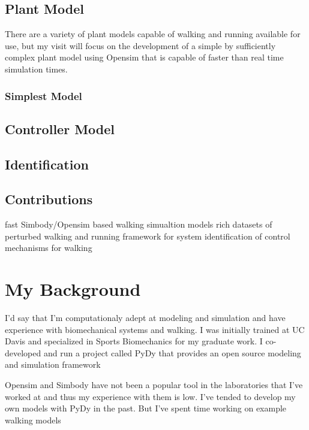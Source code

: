 \documentclass[11pt]{article}
\begin{document}
\subsection{Plant Model}

There are a variety of plant models capable of walking and running available
for use, but my visit will focus on the development of a simple by sufficiently
complex plant model using Opensim that is capable of faster than real time
simulation times.

\subsubsection{Simplest Model}


\subsection{Controller Model}

\subsection{Identification}

\subsection{Contributions}

fast Simbody/Opensim based walking simualtion models
rich datasets of perturbed walking and running
framework for system identification of control mechanisms for walking

\section{My Background}

I'd say that I'm computationaly adept at modeling and simulation and have
experience with biomechanical systems and walking. I was initially trained at
UC Davis and specialized in Sports Biomechanics for my graduate work. I
co-developed and run a project called PyDy that provides an open source
modeling and simulation framework

Opensim and Simbody have not been a popular tool in the laboratories that I've
worked at and thus my experience with them is low. I've tended to develop my
own models with PyDy in the past. But I've spent time working on example
walking models
\end{document}
